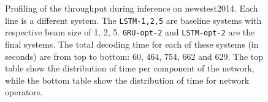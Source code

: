 \documentclass[11pt,a4paper]{article}
\begin{document}
\begin{figure}
\caption{\small Profiling of the throughput during inference on newstest2014. Each line is a different system. The {\tt LSTM-1,2,5} are baseline systems with respective beam size of 1, 2, 5. {\tt GRU-opt-2} and {\tt LSTM-opt-2} are the final systems. The total decoding time for each of these systems (in seconds) are from top to bottom: 60, 464, 754, 662 and 629. The top table show the distribution of time per component of the network, while the bottom table show the distribution of time for network operators.}
\label{fig:decoding_cost}
\end{figure}
\end{document}
